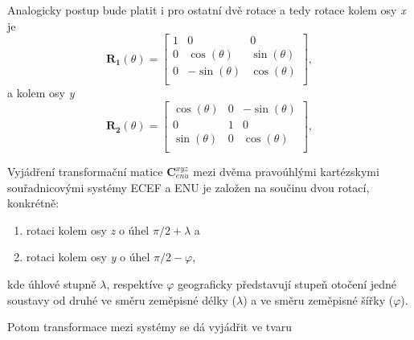 \documentclass[11pt,a4paper]{article}
\begin{document}
Analogicky postup bude platit i pro ostatní dvě rotace a tedy rotace kolem osy \textit{x} je
\begin{equation}
\mathbf{R_{1}}\left(\theta\right) = 
\begin{bmatrix}
1 & 0 & 0 \\
0 &  \cos{\left(\theta\right)} & \sin{\left(\theta\right)} \\
0 & -\sin{\left(\theta\right)} & \cos{\left(\theta\right)} \\
\end{bmatrix},
\end{equation}
a kolem osy \textit{y}
\begin{equation}
\mathbf{R_{2}}\left(\theta\right) = 
\begin{bmatrix}
\cos{\left(\theta\right)} & 0 & -\sin{\left(\theta\right)} \\
0 & 1 & 0 \\
\sin{\left(\theta\right)} & 0 & \cos{\left(\theta\right)} \\
\end{bmatrix},
\end{equation}

Vyjádření transformační matice $\mathbf {C}_{enu}^{xyz} $ mezi dvěma pravoúhlými kartézskymi souřadnicovými systémy ECEF a ENU je založen na součinu dvou rotací, konkrétně:
\begin{enumerate}
\item rotaci kolem osy \textit{z} o úhel $\pi/2 + \lambda $ a
\item rotaci kolem osy \textit{y} o úhel $\pi/2 - \varphi $,
\end{enumerate}
kde úhlové stupně $\lambda$, respektíve $\varphi$ geograficky představují stupeň otočení jedné soustavy od druhé ve směru zeměpisné délky ($\lambda$) a ve směru zeměpisné šířky ($\varphi$).

Potom transformace mezi systémy se dá vyjádřit ve tvaru
\end{document}
